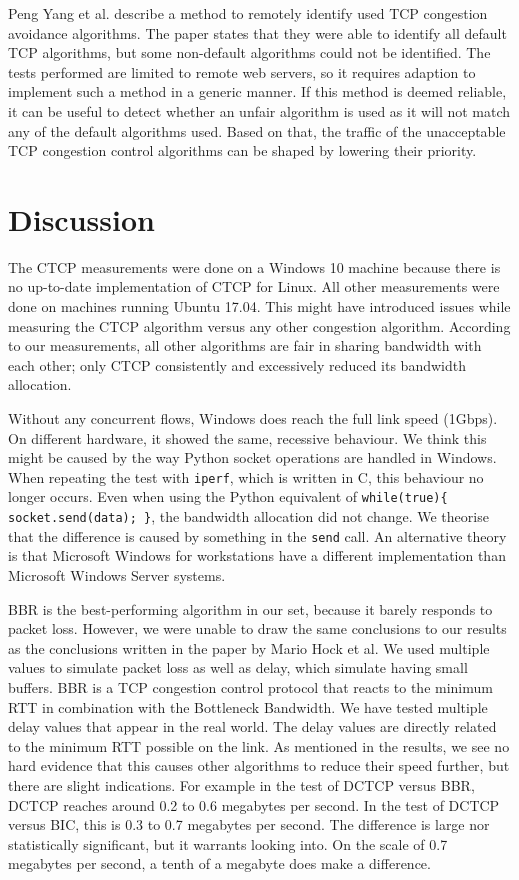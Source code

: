 \documentclass{article}
\begin{document}
Peng Yang et al.\cite{tcp-congestion-identification} describe a method to
remotely identify used TCP congestion avoidance algorithms. The paper states
that they were able to identify all default TCP algorithms, but some
non-default algorithms could not be identified. The tests performed are limited
to remote web servers, so it requires adaption to implement such a method in a
generic manner. If this method is deemed reliable, it can be useful to detect
whether an unfair algorithm is used as it will not match
any of the default algorithms used. Based on that, the traffic of the
unacceptable TCP congestion control algorithms can be shaped by lowering their
priority.


\section{Discussion}\label{sec:discussion}

The CTCP measurements were done on a Windows 10 machine because there is no
up-to-date implementation of CTCP for Linux. All other measurements were done
on machines running Ubuntu 17.04. This might have introduced issues while
measuring the CTCP algorithm versus any other congestion algorithm. According
to our measurements, all other algorithms are fair in sharing bandwidth with
each other; only CTCP consistently and excessively reduced its bandwidth
allocation.

Without any concurrent flows, Windows does reach the full link speed (1Gbps).
On different hardware, it showed the same, recessive behaviour. We
think this might be caused by the way Python socket operations are handled in
Windows. When repeating the test with \texttt{iperf}, which is written in C,
this behaviour no longer occurs. Even when using the Python equivalent of
\texttt{while(true)\{ socket.send(data); \}}, the bandwidth allocation did not
change. We theorise that the difference is caused by something in the
\texttt{send} call. An alternative theory is that Microsoft Windows for
workstations have a different implementation than Microsoft Windows Server
systems.

BBR is the best-performing algorithm in our set, because it barely responds to
packet loss. However, we were unable to draw the same conclusions to our
results as the conclusions written in the paper by Mario Hock et
al\cite{bbr-congestion-comparison}. We used multiple values to simulate packet
loss as well as delay, which simulate having small buffers. BBR is a TCP
congestion control protocol that reacts to the minimum RTT in combination with
the Bottleneck Bandwidth. We have tested multiple delay values that appear in
the real world. The delay values are directly related to the minimum RTT
possible on the link. As mentioned in the results, we see no hard evidence that
this causes other algorithms to reduce their speed further, but there are
slight indications. For example in the test of DCTCP versus BBR, DCTCP reaches
around 0.2 to 0.6 megabytes per second. In the test of DCTCP versus BIC, this
is 0.3 to 0.7 megabytes per second. The difference is large nor statistically
significant, but it warrants looking into. On the scale of 0.7 megabytes per
second, a tenth of a megabyte does make a difference.
\end{document}
